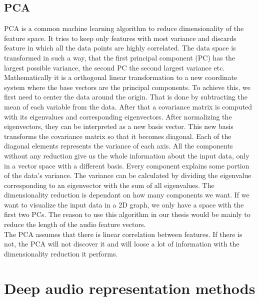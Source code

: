 \subsection{PCA}
PCA is a common machine learning algorithm to reduce dimensionality of the feature space. It tries to keep only features with most variance and discards feature in which all the data points are highly correlated. The data space is transformed in such a way, that the first principal component (PC) has the largest possible variance, the second PC the second largest variance etc. \\
Mathematically it is a orthogonal linear transformation to a new coordinate system where the base vectors are the principal components. To achieve this, we first need to center the data around the origin. That is done by subtracting the mean of each variable from the data. After that a covariance matrix is computed with its eigenvalues and corresponding eigenvectors. After normalizing the eigenvectors, they can be interpreted as a new basis vector. This new basis transforms the covariance matrix so that it becomes diagonal. Each of the diagonal elements represents the variance of each axis. All the components without any reduction give us the whole information about the input data, only in a vector space with a different basis. Every component explains some portion of the data's variance. The variance can be calculated by dividing the eigenvalue corresponding to an eigenvector with the sum of all eigenvalues. The dimensionality reduction is dependant on how many components we want. If we want to visualize the input data in a 2D graph, we only have a space with the first two PCs. The reason to use this algorithm in our thesis would be mainly to reduce the length of the audio feature vectors. \\
The PCA assumes that there is linear correlation between features. If there is not, the PCA will not discover it and will loose a lot of information with the dimensionality reduction it performs.

\section{Deep audio representation methods}\label{sec:audio_deep_learning}

